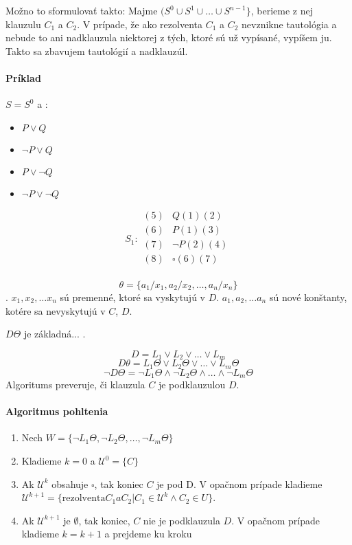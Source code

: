 \par
Možno to sformulovať takto: Majme $(S^0 \cup S^1 \cup \ldots \cup
S^{n-1}\}$, berieme z nej klauzulu $C_1$ a $C_2$. V prípade, že ako rezolventa
$C_1$ a $C_2$ nevznikne tautológia a nebude to ani nadklauzula niektorej z tých,
ktoré sú už vypísané, vypíšem ju. Takto sa zbavujem tautológií a nadklauzúl.

\paragraph{Príklad} $S=S^0$ a :
\begin{itemize}
	\item $P\lor Q$
	\item $\neg P \lor Q$
	\item $P\lor \neg Q$
	\item $\neg P \lor \neg Q$
\end{itemize}
$$
S_1:
\begin{array}{ll}
(5)& Q (1) (2)\\
(6)& P (1) (3)\\
(7)& \neg P (2) (4)\\
(8)& \square (6) (7)\\
\end{array}
$$

$$\theta = \{ a_1 / x_1, a_2 / x_2, \ldots, a_n / x_n \}$$. $x_1, x_2, \ldots
x_n$ sú premenné, ktoré sa vyskytujú v $D$. $a_1, a_2, \ldots a_n$ sú nové
konštanty, kotére sa nevyskytujú v $C$, $D$.

$D\Theta$ je základná... .

$$D = L_1 \lor L_2 \lor \ldots \lor L_m$$
$$D \theta = L_1\Theta \lor L_2 \Theta \lor \ldots \lor L_m \Theta$$
$$\neg D\Theta = \neg L_1 \Theta \land \neg L_2 \Theta \land \ldots \land \neg
L_m \Theta$$
Algoritums preveruje, či klauzula $C$ je podklauzulou $D$.

\paragraph{Algoritmus  pohltenia}
\begin{enumerate}
	\item Nech $W = \{ \neg L_1 \Theta, \neg L_2 \Theta, \ldots, \neg L_m
	\Theta \}$

	\item Kladieme $k=0$ a $\mathcal{U}^0 = \{ C \}$
	\item Ak $\mathcal{U}^k$ obsahuje $\square$, tak koniec $C$ je pod D. V
	opačnom prípade kladieme $\mathcal{U}^{k+1} = \{ \mbox{rezolventa} C_1 a
	C_2 | C_1 \in \mathcal{U}^{k} \land C_2 \in U\}$. 
	\item Ak $\mathcal{U}^{k+1}$ je $\emptyset$, tak koniec, $C$ nie je
	podklauzula $D$. V opačnom prípade kladieme $k=k+1$ a prejdeme ku kroku

\end{enumerate}

